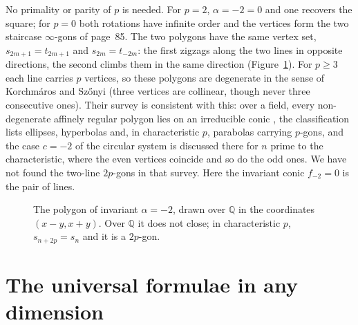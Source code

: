 \documentclass[11pt,a4paper]{amsart}
\theoremstyle{definition}
\theoremstyle{remark}
\newcommand{\Q}{\mathbb Q}
\begin{document}
No primality or parity of $p$ is needed. For $p = 2$, $\alpha = -2 = 0$ and one recovers the square; for $p = 0$ both rotations have infinite order and the vertices form the two staircase $\infty$-gons of page~85. The two polygons have the same vertex set, $s_{2m+1} = t_{2m+1}$ and $s_{2m} = t_{-2m}$: the first zigzags along the two lines in opposite directions, the second climbs them in the same direction (Figure~\ref{fig:strip}). For $p \ge 3$ each line carries $p$ vertices, so these polygons are degenerate in the sense of Korchmáros and Sz\H{o}nyi (three vertices are collinear, though never three consecutive ones). Their survey is consistent with this: over a field, every non-degenerate affinely regular polygon lies on an irreducible conic \cite[Lemma~2.2]{korchmarosszonyi2008}, the classification \cite[Th.~2.1 and~2.3]{korchmarosszonyi2008} lists ellipses, hyperbolas and, in characteristic $p$, parabolas carrying $p$-gons, and the case $c = -2$ of the circular system is discussed there for $n$ prime to the characteristic, where the even vertices coincide and so do the odd ones. We have not found the two-line $2p$-gons in that survey. Here the invariant conic $f_{-2} = 0$ is the pair of lines.

\begin{figure}[ht]
\centering
{}
\caption{The polygon of invariant $\alpha = -2$, drawn over $\Q$ in the coordinates $(x - y, x + y)$. Over $\Q$ it does not close; in characteristic $p$, $s_{n+2p} = s_n$ and it is a $2p$-gon.}\label{fig:strip}
\end{figure}

\section{The universal formulae in any dimension}\label{sec:univ}
\end{document}

